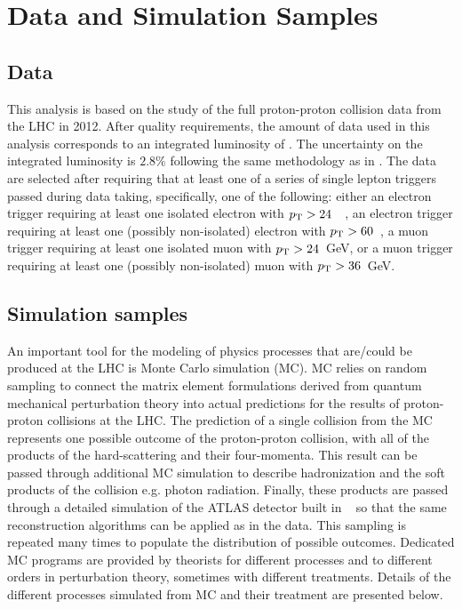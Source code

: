 \section{Data and Simulation Samples}
\subsection{Data}
\label{sec:subsection_data}



This analysis is based on the study of the full proton-proton collision
data from the LHC in 2012. After quality requirements, the amount 
of data used in this analysis corresponds to 
an integrated luminosity of \lumi.
The uncertainty on the integrated luminosity is $2.8\%$ 
following the same methodology as in \cite{Aad:2013ucp}.
The data are selected after requiring that at least one
of a series of single lepton triggers passed during data taking, 
specifically, one of the following:
either an electron trigger 
requiring at least one isolated
electron with $p_{\mathrm{T}}>24$~\GeV~, an electron trigger requiring
at least one (possibly non-isolated) electron 
with $p_{\mathrm{T}}>60$~\GeV, a muon 
trigger requiring at least one isolated muon with $p_{\mathrm{T}}>24$~GeV,
or a muon trigger requiring at least one 
(possibly non-isolated) muon with $p_{\mathrm{T}}>36$~GeV.


\subsection{Simulation samples}

An important tool for the modeling of physics processes
that are/could be produced at the LHC is Monte Carlo simulation (MC).
MC relies on random sampling to connect the matrix element formulations
derived from quantum mechanical perturbation theory into 
actual predictions for the results of proton-proton collisions
at the LHC.
The prediction of a single collision from the MC represents
one possible outcome of the proton-proton collision, with all of the 
products of the hard-scattering and their four-momenta.
This result can be passed through additional MC simulation to describe
hadronization and the soft products of the collision e.g. photon radiation.
Finally, these products are passed through a detailed 
simulation of the ATLAS detector built in \geant~\cite{Agostinelli:2002hh}
so that the same reconstruction algorithms
can be applied as in the data.
This sampling is repeated many times to populate the 
distribution of possible
outcomes. Dedicated MC programs are provided by theorists for 
different processes and to different orders in perturbation theory,
sometimes with different treatments.
Details of the different processes simulated from MC and their
treatment are presented below.





\newpage




